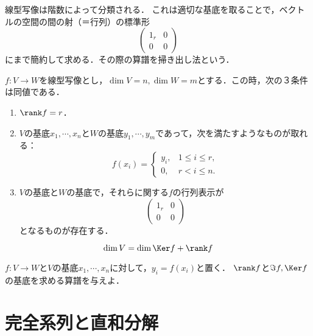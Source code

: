 \documentclass[uplatex, dvipdfmx]{jsreport}
\begin{document}
\begin{tcolorbox}[colframe=ForestGreen, colback=ForestGreen!10!white, breakable]
    線型写像は階数によって分類される．
    これは適切な基底を取ることで，ベクトルの空間の間の射（＝行列）の標準形
    \[\begin{pmatrix}1_r&0\\0&0\end{pmatrix}\]
    にまで簡約して求める．その際の算譜を掃き出し法という．
\end{tcolorbox}

\begin{proposition}[線型写像の階数による分類]
    $f:V\to W$を線型写像とし，$\dim V=n, \dim W=m$とする．この時，次の３条件は同値である．
    \begin{enumerate}
        \item $\rank f=r$．
        \item $V$の基底$x_1,\cdots,x_n$と$W$の基底$y_1,\cdots,y_m$であって，次を満たすようなものが取れる：
        \[f(x_i)=\begin{cases}
            y_i,&1\le i\le r,\\
            0,&r<i\le n.
        \end{cases}\]
        \item $V$の基底と$W$の基底で，それらに関する$f$の行列表示が\[\begin{pmatrix}1_r&0\\0&0\end{pmatrix}\]となるものが存在する．
    \end{enumerate}
\end{proposition}

\begin{corollary}[次元定理]\label{cor-thm-of-dimention}
    \[ \dim V=\dim\Ker f+\rank f \]
\end{corollary}

\begin{problem}
    $f:V\to W$と$V$の基底$x_1,\cdots,x_n$に対して，$y_i=f(x_i)$と置く．
    $\rank f$と$\Im f,\Ker f$の基底を求める算譜を与えよ．
\end{problem}

\section{完全系列と直和分解}
\end{document}
